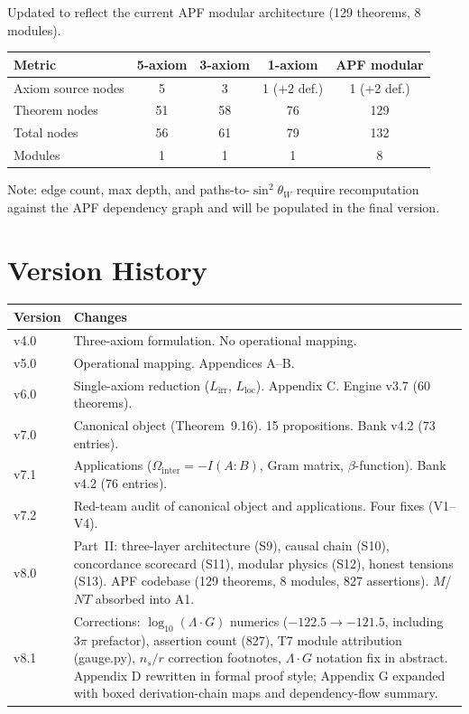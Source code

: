 \documentclass[11pt]{article}
\begin{document}
Updated to reflect the current APF modular architecture (129 theorems, 8 modules).

\smallskip
\begin{center}
\small
\begin{tabular}{lcccc}
\toprule
\textbf{Metric} & \textbf{5-axiom} & \textbf{3-axiom} & \textbf{1-axiom} & \textbf{APF modular} \\
\midrule
Axiom source nodes & 5 & 3 & 1 (+2 def.) & 1 (+2 def.) \\
Theorem nodes & 51 & 58 & 76 & 129 \\
Total nodes & 56 & 61 & 79 & 132 \\
Modules & 1 & 1 & 1 & 8 \\
\bottomrule
\end{tabular}
\end{center}
\smallskip

\noindent Note: edge count, max depth, and paths-to-$\sin^2\!\theta_W$ require recomputation against the APF dependency graph and will be populated in the final version.


\section{Version History}

\smallskip
\begin{center}
\small
\begin{tabular}{lp{9cm}}
\toprule
\textbf{Version} & \textbf{Changes} \\
\midrule
v4.0 & Three-axiom formulation.  No operational mapping. \\
v5.0 & Operational mapping.  Appendices A--B. \\
v6.0 & Single-axiom reduction ($L_{\mathrm{irr}}$, $L_{\mathrm{loc}}$).  Appendix C.  Engine v3.7 (60 theorems). \\
v7.0 & Canonical object (Theorem~9.16).  15 propositions.  Bank v4.2 (73 entries). \\
v7.1 & Applications ($\Omega_{\mathrm{inter}} = -I(A{:}B)$, Gram matrix, $\beta$-function).  Bank v4.2 (76 entries). \\
v7.2 & Red-team audit of canonical object and applications.  Four fixes (V1--V4). \\
v8.0 & Part~II: three-layer architecture (S9), causal chain (S10), concordance scorecard (S11), modular physics (S12), honest tensions (S13).  APF codebase (129 theorems, 8 modules, 827 assertions).  $M$/$NT$ absorbed into A1. \\
v8.1 & Corrections: $\log_{10}(\Lambda\!\cdot\! G)$ numerics ($-122.5 \to -121.5$, including $3\pi$ prefactor), assertion count (827), T7 module attribution (gauge.py), $n_s/r$ correction footnotes, $\Lambda\!\cdot\! G$ notation fix in abstract.  Appendix D rewritten in formal proof style; Appendix G expanded with boxed derivation-chain maps and dependency-flow summary. \\
\bottomrule
\end{tabular}
\end{center}
\end{document}
